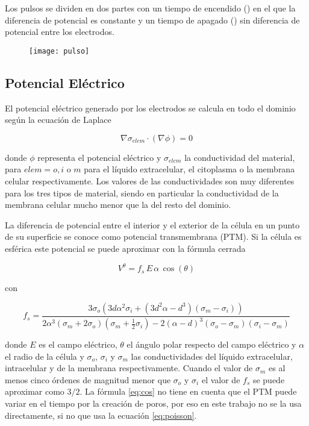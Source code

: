 Los pulsos se dividen en dos partes con un tiempo de encendido (\ontime) en el que la diferencia de potencial es constante y un tiempo de apagado (\offtime) sin diferencia de potencial entre los electrodos.

\begin{figure}[h]
	\centering
	\texttt{[image: pulso]}
\end{figure}


\subsection*{Potencial Eléctrico}
El potencial eléctrico generado por los electrodos se calcula en todo el dominio según la ecuación de Laplace \cite{c9-fem-electro}

\begin{equation} \label{eq:poisson}
	\nabla \sigma_{elem} \cdot (\nabla \phi) = 0 
\end{equation}

donde $\phi$ representa el potencial eléctrico y $\sigma_{elem}$ la conductividad del material, para $elem = o, i$ o $m$ para el líquido extracelular, el citoplasma o la membrana celular respectivamente. Los valores de las conductividades son muy diferentes para los tres tipos de material, siendo en particular la conductividad de la membrana celular mucho menor que la del resto del dominio.

La diferencia de potencial entre el interior y el exterior de la célula en un punto de su superficie se conoce como potencial transmembrana (PTM). Si la célula es esférica este potencial se puede aproximar con la fórmula cerrada \cite{tsong}

\begin{equation} \label{eq:cos}
	 V^{\theta} = f_s\, E\, \alpha\, \cos (\theta) 
\end{equation}

con

\begin{equation} \label{eq:lambda}
    f_s = \frac{3\sigma_o \left( 3 d \alpha^2 \sigma_i + \left( 3 d^2 \alpha - d^3 \right) \left(\sigma_m - \sigma_i \right) \right)}{2 \alpha^3 \left( \sigma_m + 2 \sigma_o \right) \left(\sigma_m + \frac{1}{2} \sigma_i \right) - 2 \left(\alpha - d \right)^3 \left(\sigma_o - \sigma_m \right) \left( \sigma_i - \sigma_m \right)}
\end{equation}

donde $E$ es el campo eléctrico, $\theta$ el ángulo polar respecto del campo eléctrico y $\alpha$ el radio de la célula y $\sigma_o$, $\sigma_i$ y $\sigma_m$ las conductividades del líquido extracelular, intracelular y de la membrana respectivamente. Cuando el valor de $\sigma_m$ es al menos cinco órdenes de magnitud menor que $\sigma_o$ y $\sigma_i$ el valor de $f_s$ se puede aproximar como $3/2$\cite{c5-puchiar}. La fórmula \ref{eq:cos} no tiene en cuenta que el PTM puede variar en el tiempo por la creación de poros, por eso en este trabajo no se la usa directamente, si no que usa la ecuación \ref{eq:poisson}.

